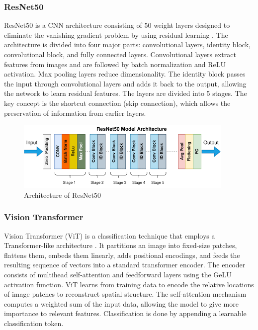 \documentclass{ijclclp}
\begin{document}
\vspace{1em}

\subsubsection{ResNet50}
ResNet50 is a CNN architecture consisting of 50 weight layers designed to eliminate the vanishing gradient problem by using residual learning \cite{resnet,resnet50medium}. The architecture is divided into four major parts: convolutional layers, identity block, convolutional block, and fully connected layers. Convolutional layers extract features from images and are followed by batch normalization and ReLU activation. Max pooling layers reduce dimensionality. The identity block passes the input through convolutional layers and adds it back to the output, allowing the network to learn residual features. The layers are divided into 5 stages. The key concept is the shortcut connection (skip connection), which allows the preservation of information from earlier layers. 

\begin{figure}[ht]
    \centering
    \includegraphics[width=0.65\linewidth]{image6.png}
    \caption{Architecture of ResNet50}
    \label{fig:resnet-arch}
\end{figure}



\subsubsection{Vision Transformer}
Vision Transformer (ViT) is a classification technique that employs a Transformer-like architecture \cite{xu2023automatic,vitmedium}. It partitions an image into fixed-size patches, flattens them, embeds them linearly, adds positional encodings, and feeds the resulting sequence of vectors into a standard transformer encoder. The encoder consists of multihead self-attention and feedforward layers using the GeLU activation function. ViT learns from training data to encode the relative locations of image patches to reconstruct spatial structure. The self-attention mechanism computes a weighted sum of the input data, allowing the model to give more importance to relevant features. Classification is done by appending a learnable classification token.
\end{document}

